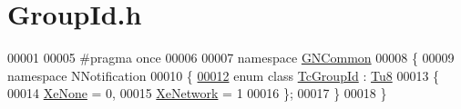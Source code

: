 \hypertarget{_group_id_8h_source}{}\section{Group\+Id.\+h}
\label{_group_id_8h_source}

\begin{DoxyCode}
00001 
00005 \textcolor{preprocessor}{#pragma once}
00006 
00007 \textcolor{keyword}{namespace }\mbox{\hyperlink{namespace_g_n_common}{GNCommon}}
00008 \{
00009    \textcolor{keyword}{namespace }NNotification
00010    \{
\mbox{\hyperlink{namespace_g_n_common_1_1_n_notification_af29017ad6ed59156beabc385a91db18e}{00012}}       \textcolor{keyword}{enum class} \mbox{\hyperlink{namespace_g_n_common_1_1_n_notification_af29017ad6ed59156beabc385a91db18e}{TcGroupId}} : \mbox{\hyperlink{namespace_g_n_common_a7939e251ddbf5d3a31832dcfdc8bde39}{Tu8}}
00013       \{
00014          \mbox{\hyperlink{namespace_g_n_common_1_1_n_notification_ab468f440599e6d5a51d887dfa55b06b3ab1dd4ba140ef44b2b6e425a90b4d11ba}{XeNone}}    = 0, 
00015          \mbox{\hyperlink{namespace_g_n_common_1_1_n_notification_af29017ad6ed59156beabc385a91db18eaf127afdc99e6a03185eab77f17740359}{XeNetwork}} = 1  
00016       \};
00017    \}
00018 \}
\end{DoxyCode}
